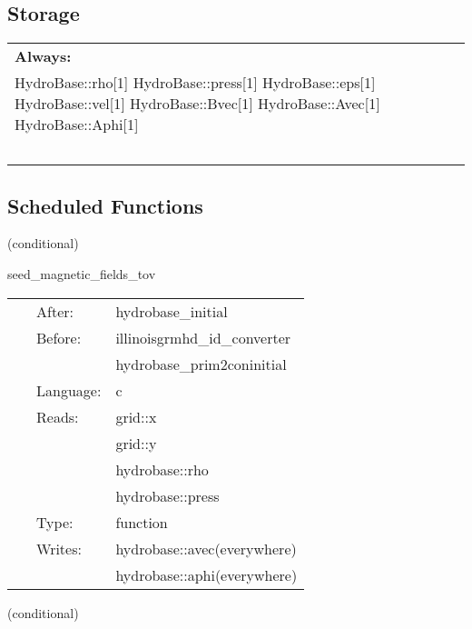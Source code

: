 \documentclass{article}
\begin{document}
\subsection*{Storage}

\hspace{5mm}

 \begin{tabular*}{160mm}{ll} 

{\bf Always:}&  ~ \\ 
 HydroBase::rho[1] HydroBase::press[1] HydroBase::eps[1] HydroBase::vel[1] HydroBase::Bvec[1] HydroBase::Avec[1] HydroBase::Aphi[1] & ~\\ 
~ & ~\\ 
\end{tabular*} 


\subsection*{Scheduled Functions}
\vspace{5mm}

   (conditional) 

\hspace{5mm} seed\_magnetic\_fields\_tov 

\hspace{5mm}{\it set up tov seed magnetic fields. } 


\hspace{5mm}

 \begin{tabular*}{160mm}{cll} 
~ & After:  & hydrobase\_initial \\ 
~ & Before:  & illinoisgrmhd\_id\_converter \\ 
~& ~ &hydrobase\_prim2coninitial\\ 
~ & Language:  & c \\ 
~ & Reads:  & grid::x \\ 
~& ~ &grid::y\\ 
~& ~ &hydrobase::rho\\ 
~& ~ &hydrobase::press\\ 
~ & Type:  & function \\ 
~ & Writes:  & hydrobase::avec(everywhere) \\ 
~& ~ &hydrobase::aphi(everywhere)\\ 
\end{tabular*} 


\vspace{5mm}

   (conditional) 
\end{document}

